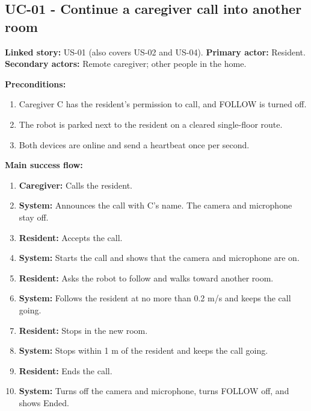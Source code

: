 \documentclass[12pt,letterpaper]{article}
\begin{document}
\subsection*{UC-01 - Continue a caregiver call into another room}

\textbf{Linked story:} US-01 (also covers US-02 and US-04). \textbf{Primary actor:} Resident. \textbf{Secondary actors:} Remote caregiver; other people in the home.

\textbf{Preconditions:}

\begin{enumerate}\setlength{\itemsep}{2pt}

\item Caregiver C has the resident's permission to call, and FOLLOW is turned off.

\item The robot is parked next to the resident on a cleared single-floor route.

\item Both devices are online and send a heartbeat once per second.

\end{enumerate}

\textbf{Main success flow:}

\begin{enumerate}\setlength{\itemsep}{2pt}

\item \textbf{Caregiver:} Calls the resident.

\item \textbf{System:} Announces the call with C's name. The camera and microphone stay off.

\item \textbf{Resident:} Accepts the call.

\item \textbf{System:} Starts the call and shows that the camera and microphone are on.

\item \textbf{Resident:} Asks the robot to follow and walks toward another room.

\item \textbf{System:} Follows the resident at no more than 0.2 m/s and keeps the call going.

\item \textbf{Resident:} Stops in the new room.

\item \textbf{System:} Stops within 1 m of the resident and keeps the call going.

\item \textbf{Resident:} Ends the call.

\item \textbf{System:} Turns off the camera and microphone, turns FOLLOW off, and shows Ended.

\end{enumerate}
\end{document}
